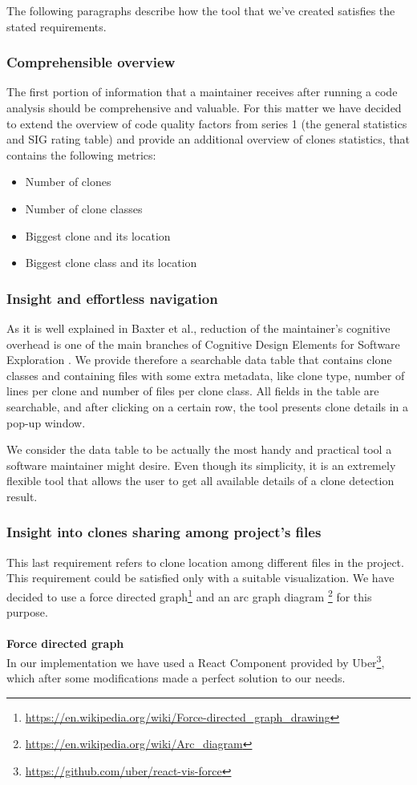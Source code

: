 \documentclass{uva-inf-article}
\begin{document}
The following paragraphs describe how the tool that we've created satisfies the stated requirements. 

\subsubsection{Comprehensible overview}
The first portion of information that a maintainer receives after running a code analysis should be comprehensive and valuable. For this matter we have decided to extend the overview of code quality factors from series 1 (the general statistics and SIG rating table) and provide an additional overview of clones statistics, that contains the following metrics: 
\begin{itemize}
	\item{Number of clones}
	\item{Number of clone classes}
	\item{Biggest clone and its location}
	\item{Biggest clone class and its location}
\end{itemize}

\subsubsection{Insight and effortless navigation}
As it is well explained in Baxter et al., reduction of the maintainer's cognitive overhead is one of the main branches of Cognitive Design Elements for Software Exploration \cite{baxter1998clone}. We provide therefore a searchable data table that contains clone classes and containing files with some extra metadata, like clone type, number of lines per clone and number of files per clone class. All fields in the table are searchable, and after clicking on a certain row, the tool presents clone details in a pop-up window. 

We consider the data table to be actually the most handy and practical tool a software maintainer might desire. Even though its simplicity, it is an extremely flexible tool that allows the user to get all available details of a clone detection result.

\subsubsection{Insight into clones sharing among project's files}
This last requirement refers to clone location among different files in the project. This requirement could be satisfied only with a suitable visualization. We have decided to use a force directed graph\footnote{\url{https://en.wikipedia.org/wiki/Force-directed_graph_drawing}} and an arc graph diagram \footnote{\url{https://en.wikipedia.org/wiki/Arc_diagram}} for this purpose. 
\\\\
\textbf{Force directed graph} 
\\
In our implementation we have used a React Component provided by Uber\footnote{\url{https://github.com/uber/react-vis-force}}, which after some modifications made a perfect solution to our needs. 
\end{document}
